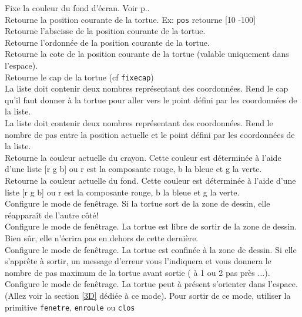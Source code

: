\label{fcfg}  
 Fixe la couleur du fond d'écran. Voir p.\pageref{couleurs}.\\
 Retourne la position courante de la tortue. Ex: \texttt{pos} retourne
{[}10 -100{]}\\
 Retourne l'abscisse de la position courante de la tortue.\\
 Retourne l'ordonnée de la position courante de la tortue.\\
 Retourne la cote de la position courante de la tortue (valable uniquement dans l'espace).\\
 Retourne le cap de la tortue (cf \texttt{fixecap})  \\
 La liste doit contenir deux nombres représentant des coordonnées. Rend le cap qu'il faut donner à la tortue pour aller vers le point défini par les coordonnées de la liste.\\
La liste doit contenir deux nombres représentant des coordonnées. Rend le nombre de pas entre la position actuelle et le point défini par les coordonnées de la liste.\\
 Retourne la couleur actuelle du crayon. Cette couleur est déterminée à l'aide d'une liste [r g b] ou r est la composante rouge, b la bleue et g la verte.  \\
 Retourne la couleur actuelle du fond. Cette couleur est déterminée à l'aide d'une liste [r g b] ou r est la composante rouge, b la bleue et g la verte.  \\
Configure le mode de fenêtrage. Si la tortue sort de la zone de dessin, elle réapparaît de l'autre côté!\\
Configure le mode de fenêtrage. La tortue est libre de sortir de la zone de dessin. Bien sûr, elle n'écrira pas en dehors de cette dernière.\\
Configure le mode de fenêtrage. La tortue est confinée à la zone de dessin. Si elle s'apprête à sortir, un message d'erreur vous l'indiquera et vous donnera le nombre de pas maximum de la tortue avant sortie ( à 1 ou 2 pas près ...).\\
Configure le mode de fenêtrage. La tortue peut à présent s'orienter dans l'espace. (Allez voir la section \ref{3D} dédiée à ce mode). Pour sortir de ce mode, utiliser la primitive \texttt{fenetre}, \texttt{enroule} ou \texttt{clos}\\
